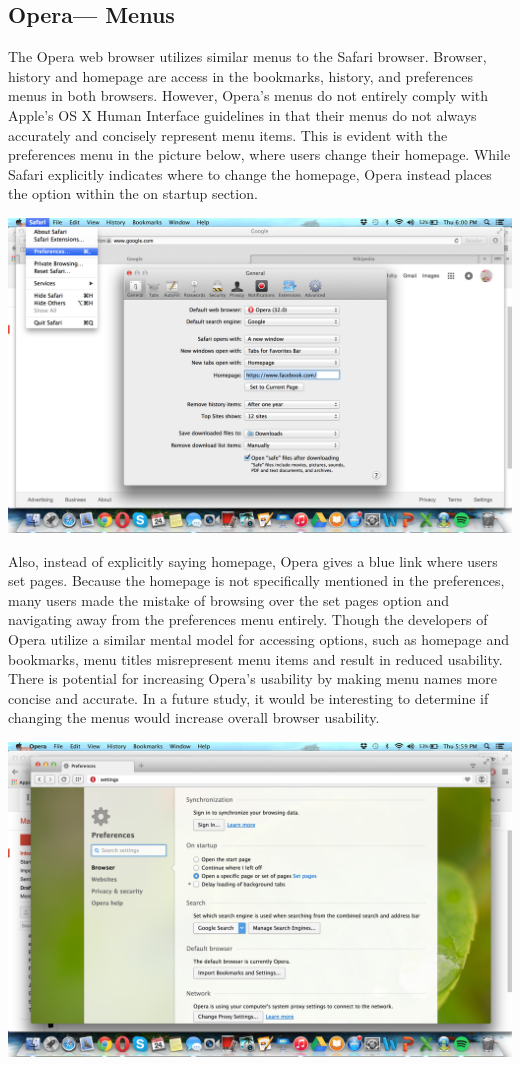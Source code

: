 \documentclass{article}
\begin{document}
\subsection{Opera--- Menus} The Opera web browser utilizes similar menus to the Safari browser. Browser, history and homepage are access in the bookmarks, history, and preferences menus in both browsers. However, Opera's menus do not entirely comply with Apple's OS X Human Interface guidelines in that their menus do not always accurately and concisely represent menu items\cite{Apple}. This is evident with the preferences menu in the picture below, where users change their homepage. While Safari explicitly indicates where to change the homepage, Opera instead places the option within the on startup section. 
\begin{center}
\includegraphics[width=.9\textwidth]{Safari_Homepage.png}
\end{center}
Also, instead of explicitly saying homepage, Opera gives a blue link where users set pages. Because the homepage is not specifically mentioned in the preferences, many users made the mistake of browsing over the set pages option and navigating away from the preferences menu entirely. Though the developers of Opera utilize a similar mental model for accessing options, such as homepage and bookmarks, menu titles misrepresent menu items and result in reduced usability. There is potential for increasing Opera's usability by making menu names more concise and accurate. In a future study, it would be interesting to determine if changing the menus would increase overall browser usability.
\begin{center}
\includegraphics[width=.9\textwidth]{Opera_Homepage.png}
\end{center}
\end{document}
